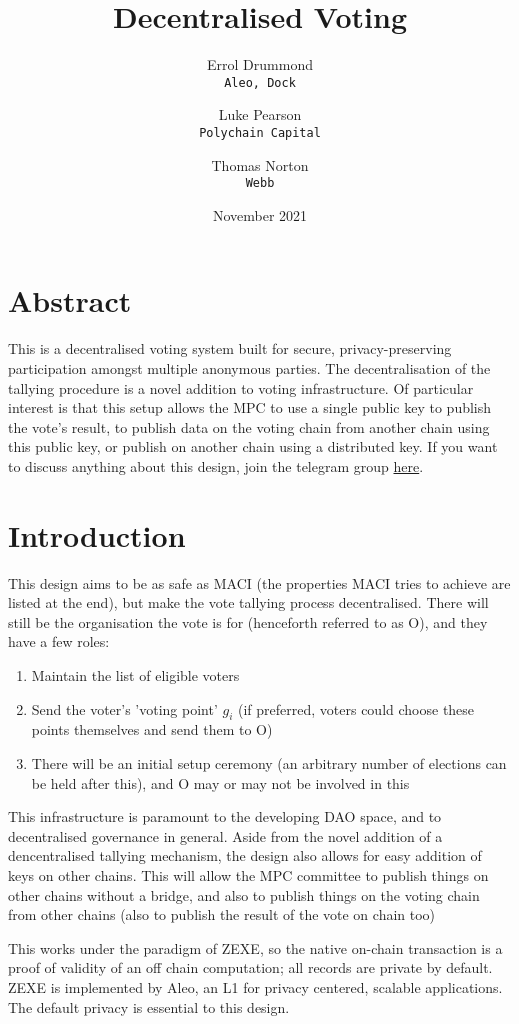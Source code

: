 \documentclass{article}
\title{Decentralised Voting}
\author{Errol Drummond\\ \texttt{Aleo, Dock}\\ \and 
 Luke Pearson\\ \texttt{Polychain Capital} \and
 Thomas Norton \\ \texttt{Webb}}
\date{November 2021}
\begin{document}
\maketitle
\section{Abstract}
This is a decentralised voting system built for secure, privacy-preserving participation amongst multiple anonymous parties. The decentralisation of the tallying procedure is a novel addition to voting infrastructure. Of particular interest is that this setup allows the MPC to use a single public key to publish the vote's result, to publish data on the voting chain from another chain using this public key, or publish on another chain using a distributed key. If you want to discuss anything about this design, join the telegram group \href{https://t.me/joinchat/5tZhfUWRwacwNzZk}{here}.

\section{Introduction}
This design aims to be as safe as MACI (the properties MACI tries to achieve are listed at the end), but make the vote tallying process decentralised. There will still be the organisation the vote is for (henceforth referred to as O), and they have a few roles:
\begin{enumerate}
    \item Maintain the list of eligible voters
    \item Send the voter's 'voting point' $g_i$ (if preferred, voters could choose these points themselves and send them to O)
    \item There will be an initial setup ceremony (an arbitrary number of elections can be held after this), and O may or may not be involved in this
\end{enumerate}

This infrastructure is paramount to the developing DAO space, and to decentralised governance in general. Aside from the novel addition of a dencentralised tallying mechanism, the design also allows for easy addition of keys on other chains. This will allow the MPC committee to publish things on other chains without a bridge, and also to publish things on the voting chain from other chains (also to publish the result of the vote on chain too)

This works under the paradigm of ZEXE, so the native on-chain transaction is a proof of validity of an off chain computation; all records are private by default. ZEXE is implemented by Aleo, an L1 for privacy centered, scalable applications. The default privacy is essential to this design.
\end{document}
